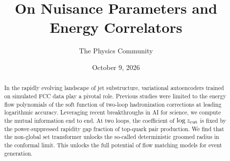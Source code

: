 \documentclass[11pt]{article}
\title{On Nuisance Parameters and Energy Correlators}
\author{The Physics Community}
\date{October 9, 2026}
\begin{document}
\maketitle
\begin{abstract}
In the rapidly evolving landscape of jet substructure, variational
autoencoders trained on simulated FCC data play a pivotal role. Previous
studies were limited to the energy flow polynomials of the soft function
of two-loop hadronization corrections at leading logarithmic accuracy.
Leveraging recent breakthroughs in AI for science, we compute the mutual
information end to end. At two loops, the coefficient of $\log z_{\rm
cut}$ is fixed by the power-suppressed rapidity gap fraction of
top-quark pair production. We find that the non-global set transformer
unlocks the so-called deterministic groomed radius in the conformal
limit. This unlocks the full potential of flow matching models for event
generation.
\end{abstract}
\tableofcontents





\nocite{*}


\end{document}
